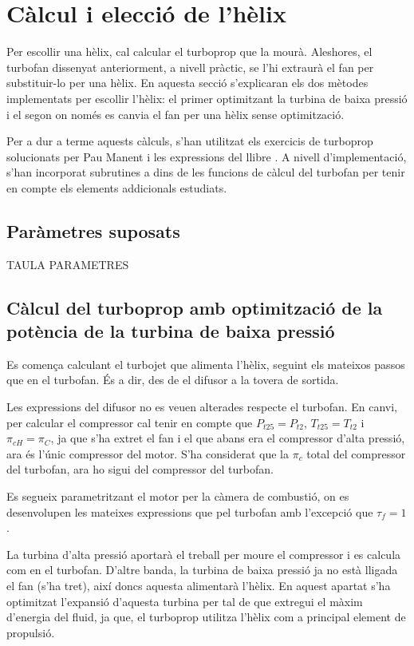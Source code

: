\section{Càlcul i elecció de l'hèlix}
Per escollir una hèlix, cal calcular el turboprop que la mourà. Aleshores, el turbofan dissenyat anteriorment, a nivell pràctic, se l'hi extraurà el fan per substituir-lo per una hèlix. En aquesta secció s'explicaran els dos mètodes implementats per escollir l'hèlix: el primer optimitzant la turbina de baixa pressió i el segon on només es canvia el fan per una hèlix sense optimització.

\noindent Per a dur a terme aquests càlculs, s'han utilitzat els exercicis de turboprop solucionats per Pau Manent i les expressions del llibre \cite{mattingly}. A nivell d'implementació, s'han incorporat subrutines a dins de les funcions de càlcul del turbofan per tenir en compte els elements addicionals estudiats.
\subsection{Paràmetres suposats}

TAULA PARAMETRES

\subsection{Càlcul del turboprop amb optimització de la potència de la turbina de baixa pressió}
Es comença calculant el turbojet que alimenta l'hèlix, seguint els mateixos passos que en el turbofan. És a dir, des de el difusor a la tovera de sortida.

\noindent Les expressions del difusor no es veuen alterades respecte el turbofan. En canvi, per calcular el compressor cal tenir en compte que $P_{t25}=P_{t2}$, $T_{t25}=T_{t2}$ i $\pi_{cH}=\pi_{C}$, ja que s'ha extret el fan i el que abans era el compressor d'alta pressió, ara és l'únic compressor del motor. S'ha considerat que la $\pi_c$ total del compressor del turbofan, ara ho sigui del compressor del turbofan.

\noindent Es segueix parametritzant el motor per la càmera de combustió, on es desenvolupen les mateixes expressions que pel turbofan amb l'excepció que $\tau_f=1$.

\noindent La turbina d'alta pressió aportarà el treball per moure el compressor i es calcula com en el turbofan. D'altre banda, la turbina de baixa pressió ja no està lligada el fan (s'ha tret), així doncs aquesta alimentarà l'hèlix. En aquest apartat s'ha optimitzat l'expansió d'aquesta turbina per tal de que extregui el màxim d'energia del fluid, ja que, el turboprop utilitza l'hèlix com a principal element de propulsió. 

